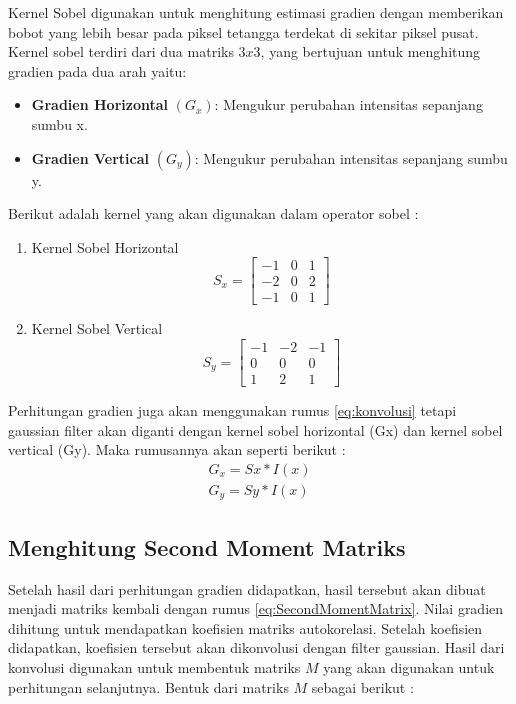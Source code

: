     Kernel Sobel digunakan untuk menghitung estimasi gradien dengan memberikan bobot yang lebih besar pada piksel tetangga terdekat di sekitar piksel pusat.
Kernel sobel terdiri dari dua matriks \(3 x 3\), yang bertujuan untuk menghitung gradien pada dua arah yaitu:
 \begin{itemize}
    \item \textbf{Gradien Horizontal} \((G_{x})\): Mengukur perubahan intensitas sepanjang sumbu x.
    \item \textbf{Gradien Vertical} \((G_{y})\): Mengukur perubahan intensitas sepanjang sumbu y.
\end{itemize}
    Berikut adalah kernel yang akan digunakan dalam operator sobel :
\begin{enumerate}
    \item Kernel Sobel Horizontal
    \begin{equation*}
        S_{x} = 
        \begin{bmatrix}
            -1 & 0 & 1 \\
            -2 & 0 & 2 \\
            -1 & 0 & 1
          \end{bmatrix}
    \end{equation*}

    \item  Kernel Sobel Vertical
    \begin{equation*}
        S_{y} = 
        \begin{bmatrix}
            -1 & -2 & -1 \\
            0 & 0 & 0 \\
            1 & 2 & 1
          \end{bmatrix}
    \end{equation*}

\end{enumerate}
Perhitungan gradien juga akan menggunakan rumus \eqref{eq:konvolusi} tetapi gaussian filter akan diganti dengan kernel sobel horizontal (Gx) dan kernel sobel vertical (Gy).
Maka rumusannya akan seperti berikut :
\begin{equation}
    \begin{aligned}
        G_{x} = Sx * I(x)\\ G_{y} = Sy * I(x)
    \end{aligned}
\end{equation}


\subsection{Menghitung Second Moment Matriks}
    Setelah hasil dari perhitungan gradien didapatkan, hasil tersebut akan dibuat menjadi matriks kembali dengan rumus \eqref{eq:SecondMomentMatrix}. Nilai gradien dihitung untuk mendapatkan koefisien matriks autokorelasi. Setelah koefisien didapatkan, koefisien tersebut akan dikonvolusi dengan filter gaussian.
Hasil dari konvolusi digunakan untuk membentuk matriks \(M\) yang akan digunakan untuk perhitungan selanjutnya. Bentuk dari matriks \(M\) sebagai berikut :

